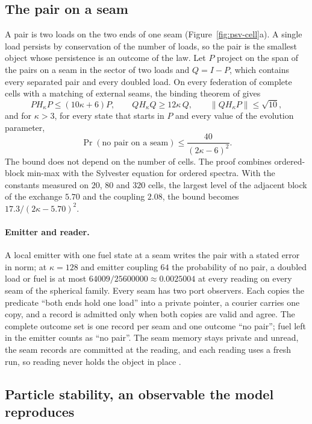 \subsection{The pair on a seam}

A pair is two loads on the two ends of one seam (Figure~\ref{fig:psv-cell}a). A single
load persists by conservation of the number of loads, so the pair is the smallest object
whose persistence is an outcome of the law. Let $P$ project on the span of the pairs on a
seam in the sector of two loads and $Q=I-P$, which contains every separated pair and
every doubled load. On every federation of complete cells with a matching of external
seams, the binding theorem of \cite{ophmodel} gives
\[
 PH_\kappa P\le(10\kappa+6)P,\qquad QH_\kappa Q\ge12\kappa\,Q,\qquad
 \|QH_\kappa P\|\le\sqrt{10},
\]
and for $\kappa>3$, for every state that starts in $P$ and every value of the evolution
parameter,
\begin{equation}
 \Pr(\text{no pair on a seam})\le\frac{40}{(2\kappa-6)^2}.
 \label{eq:psv-binding}
\end{equation}
The bound does not depend on the number of cells. The proof combines ordered-block
min-max with the Sylvester equation for ordered spectra. With the constants measured on
$20$, $80$ and $320$ cells, the largest level of the adjacent block of the exchange
$5.70$ and the coupling $2.08$, the bound becomes $17.3/(2\kappa-5.70)^2$.

\paragraph{Emitter and reader.}
A local emitter with one fuel state at a seam writes the pair with a stated error in
norm; at $\kappa=128$ and emitter coupling $64$ the probability of no pair, a doubled load
or fuel is at most $64009/25600000\approx0.0025004$ at every reading on every seam of the spherical family. Every
seam has two port observers. Each copies the predicate ``both ends hold one load'' into a
private pointer, a courier carries one copy, and a record is admitted only when both
copies are valid and agree. The complete outcome set is one record per seam and one
outcome ``no pair''; fuel left in the emitter counts as ``no pair''. The seam memory stays
private and unread, the seam records are committed at the reading, and each reading uses
a fresh run, so reading never holds the object in place \cite{ophmodel}.

\subsection{Particle stability, an observable the model reproduces}
\label{sec:psv-stability}

